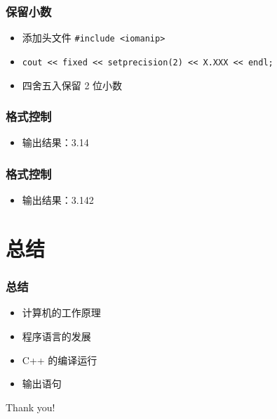 \begin{frame}[fragile]
    \frametitle{保留小数}

    \begin{itemize}[<+->]
        \item 添加头文件 \lstinline|#include <iomanip>|
        \item \lstinline|cout << fixed << setprecision(2) << X.XXX << endl;|
        \item 四舍五入保留 2 位小数
    \end{itemize}
\end{frame}

\begin{frame}[fragile]
    \frametitle{格式控制}

    

    \begin{itemize}
        \item<2-> 输出结果：3.14
    \end{itemize}
\end{frame}

\begin{frame}[fragile]
    \frametitle{格式控制}

    

    \begin{itemize}
        \item<2-> 输出结果：3.142
    \end{itemize}
\end{frame}


\section{总结}

\begin{frame}[fragile]
    \frametitle{总结}

    \begin{itemize}
        \item 计算机的工作原理
        \item 程序语言的发展
        \item C++ 的编译运行
        \item 输出语句
    \end{itemize}
\end{frame}

\begin{frame}
    \begin{center}
        {\Huge Thank you!}
    \end{center}
\end{frame}


